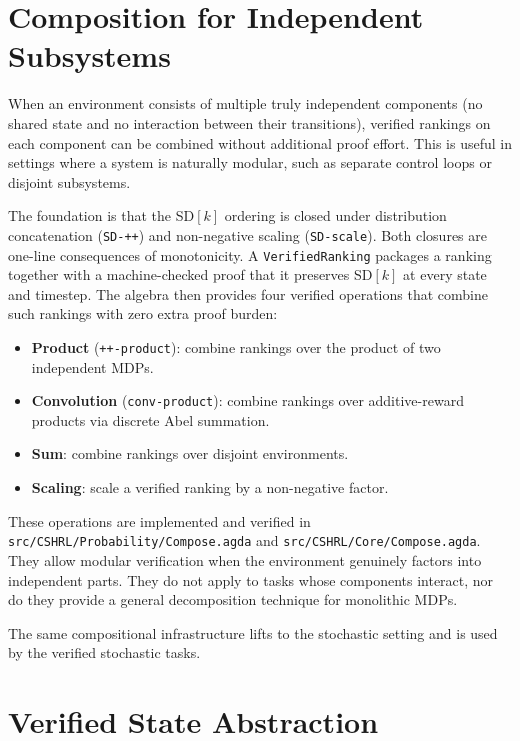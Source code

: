 \documentclass[runningheads]{llncs}
\newcommand{\fpath}[1]{\nolinkurl{#1}}
\begin{document}
\section{Composition for Independent Subsystems}\label{sec:compose}

When an environment consists of multiple truly independent components (no shared state and no interaction between their transitions), verified rankings on each component can be combined without additional proof effort.  This is useful in settings where a system is naturally modular, such as separate control loops or disjoint subsystems.

The foundation is that the SD$[k]$ ordering is closed under distribution concatenation (\texttt{SD-++}) and non-negative scaling (\texttt{SD-scale}).  Both closures are one-line consequences of monotonicity.  A \texttt{VerifiedRanking} packages a ranking together with a machine-checked proof that it preserves SD$[k]$ at every state and timestep.  The algebra then provides four verified operations that combine such rankings with zero extra proof burden:

\begin{itemize}
\item \textbf{Product} (\texttt{++-product}): combine rankings over the product of two independent MDPs.
\item \textbf{Convolution} (\texttt{conv-product}): combine rankings over additive-reward products via discrete Abel summation.
\item \textbf{Sum}: combine rankings over disjoint environments.
\item \textbf{Scaling}: scale a verified ranking by a non-negative factor.
\end{itemize}

These operations are implemented and verified in \fpath{src/CSHRL/Probability/Compose.agda} and \fpath{src/CSHRL/Core/Compose.agda}.  They allow modular verification when the environment genuinely factors into independent parts.  They do not apply to tasks whose components interact, nor do they provide a general decomposition technique for monolithic MDPs.

The same compositional infrastructure lifts to the stochastic setting and is used by the verified stochastic tasks.

\section{Verified State Abstraction}\label{sec:abstraction}
\end{document}
